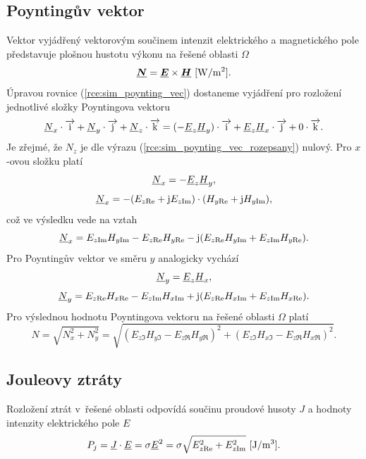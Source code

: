 \subsection*{Poyntingův vektor}
Vektor vyjádřený vektorovým součinem intenzit elektrického a magnetického pole představuje plošnou hustotu výkonu na řešené oblasti $\Omega$
\begin{equation}
	\mbox{\underline{\boldmath$N$}} = \mbox{\underline{\boldmath$E$}} \times\mbox{\underline{\boldmath$H$}}\mathrm{\ [W/m^{2}]}.
	\label{rce:sim_poynting_vec}
\end{equation}
Úpravou rovnice (\ref{rce:sim_poynting_vec}) dostaneme vyjádření pro rozložení jednotlivé složky Poyntingova vektoru
\begin{equation}
	{\underline{N}}_x \cdot\overrightarrow{\mathrm{i}} + {\underline{N}}_y \cdot\overrightarrow{\mathrm{j}} + {\underline{N}}_z \cdot\overrightarrow{\mathrm{k}} = (-{\underline{E}}_z {\underline{H}}_y) \cdot\overrightarrow{\mathrm{i}} + {\underline{E}}_z {\underline{H}}_x \cdot\overrightarrow{\mathrm{j}} + 0 \cdot\overrightarrow{\mathrm{k}}.
	\label{rce:sim_poynting_vec_rozepsany}
\end{equation}
Je zřejmé, že $N_z$ je dle výrazu (\ref{rce:sim_poynting_vec_rozepsany}) nulový. Pro $x$-ovou složku platí
\begin{displaymath}
	{\underline{N}}_x = -{\underline{E}}_z {\underline{H}}_y,
\end{displaymath}
\begin{displaymath}
	{\underline{N}}_x = -(E_{z\mathrm{Re}} + \mathrm{j} E_{z\mathrm{Im}})\cdot (H_{y\mathrm{Re}} + \mathrm{j} H_{y\mathrm{Im}}),
\end{displaymath}
což ve výsledku vede na vztah
\begin{displaymath}
	{\underline{N}}_x = E_{z\mathrm{Im}} H_{y\mathrm{Im}} - E_{z\mathrm{Re}} H_{y\mathrm{Re}} - \mathrm{j} (E_{z\mathrm{Re}} H_{y\mathrm{Im}} + E_{z\mathrm{Im}} H_{y\mathrm{Re}}).
\end{displaymath}
Pro Poyntingův vektor ve směru $y$ analogicky vychází
\begin{displaymath}
	{\underline{N}}_y = {\underline{E}}_z {\underline{H}}_x,
\end{displaymath}
\begin{displaymath}
	{\underline{N}}_y = E_{z\mathrm{Re}} H_{x\mathrm{Re}} - E_{z\mathrm{Im}} H_{x\mathrm{Im}} + \mathrm{j} (E_{z\mathrm{Re}} H_{x\mathrm{Im}} + E_{z\mathrm{Im}} H_{x\mathrm{Re}}).
\end{displaymath}
Pro výslednou hodnotu Poyntingova vektoru na řešené oblasti $\Omega$ platí
\begin{displaymath}
	N = \sqrt{N_{x}^{2} + N_{y}^{2}} = \sqrt{(E_{z\Im} H_{y\Im} - E_{z\Re} H_{y\Re})^{2} + (E_{z\Im} H_{x\Im} - E_{z\Re} H_{x\Re})^{2}}.
\end{displaymath}

\subsection*{Jouleovy ztráty}
Rozložení ztrát v~řešené oblasti odpovídá součinu proudové husoty $J$ a hodnoty intenzity elektrického pole $E$ 
\begin{displaymath}
	P_j = {\underline{J}} \cdot {\underline{E}} = \sigma {\underline{E}}^{2} = \sigma \sqrt{E_{z\mathrm{Re}}^{2} + E_{z\mathrm{Im}}^{2}}\mathrm{\ [J/m^{3}]}.
\end{displaymath}

